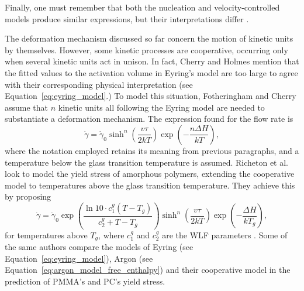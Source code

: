 Finally, one must remember that both the nucleation and velocity-controlled models produce similar expressions, but their interpretations differ \citep{fotheringhamRoleRecoveryForces1978}.

The deformation mechanism discussed so far concern the motion of kinetic units by themselves.
However, some kinetic processes are cooperative, occurring only when several kinetic units act in unison.
In fact, Cherry and Holmes \citep{cherryYieldAdhesiveJoints1969} mention that the fitted values to the activation volume in Eyring's model are too large to agree with their corresponding physical interpretation (see Equation~\eqref{eq:eyring_model}.)
To model this situation, Fotheringham and Cherry \citep{fotheringhamCommentCompressionYield1976, fotheringhamRoleRecoveryForces1978} assume that $n$ kinetic units all following the Eyring model are needed to substantiate a deformation mechanism.
The expression found for the flow rate is
\begin{equation}
  \label{eq:cooperative_flow_rule}
	\dot{\gamma}=\dot \gamma_0 \sinh ^n\left(\frac{v \tau}{2 k T}\right) \exp \left(-\frac{n \Delta H}{k T}\right),
\end{equation}
where the notation employed retains its meaning from previous paragraphs, and a temperature below the glass transition temperature is assumed.
Richeton et al. \citep{richetonFormulationCooperativeModel2005} look to model the yield stress of amorphous polymers, extending the cooperative model to temperatures above the glass transition temperature.
They achieve this by proposing
\begin{equation}
		\dot{\gamma}=\dot \gamma_0 \exp\left(\frac{\ln 10\cdot c_1^g(T - T_g)}{c_2^g + T - T_g}\right) \sinh ^n\left(\frac{v \tau}{2 k T}\right) \exp \left(-\frac{\Delta H}{k T_g}\right),
\end{equation}
for temperatures above $T_g$, where $c_1^g$ and $c_2^g$ are the WLF parameters \citep{wardIntroductionMechanicalProperties2004}.
Some of the same authors \citep{richetonThermodynamicInvestigationYieldstress2007} compare the models of Eyring (see Equation~\eqref{eq:eyring_model}), Argon (see Equation~\eqref{eq:argon_model_free_enthalpy}) and their cooperative model in the prediction of PMMA's and PC's yield stress.

